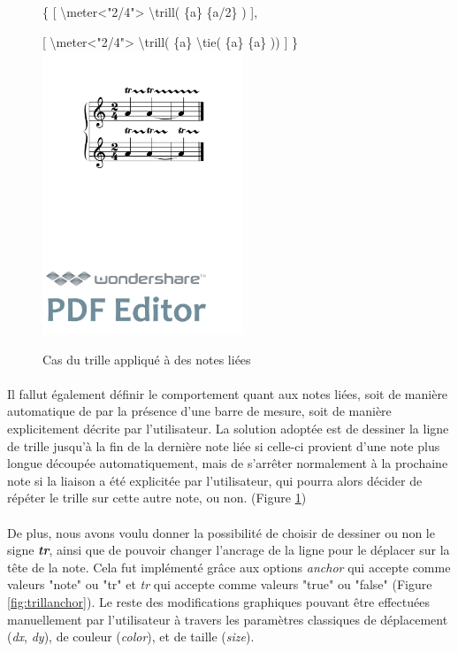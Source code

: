 \documentclass[a4paper,10pt,twocolumn]{article}
\newenvironment{code}
  {\fontfamily{pnc}\selectfont}{}
\begin{document}
\begin{figure}[h]
\centering
\begin{code}
\{
[ \textbackslash{}meter\textless{}"2/4"\textgreater{} \textbackslash{}trill( \{a\} \{a/2\} ) ],

[ \textbackslash{}meter\textless{}"2/4"\textgreater{} \textbackslash{}trill( \{a\} \textbackslash{}tie( \{a\} \{a\} )) ]
\}
\end{code}
\includegraphics[width=6cm]{img/trill.pdf}
\caption{Cas du trille appliqué à des notes liées}
\label{fig:trill}
\end{figure}

\paragraph{}
Il fallut également définir le comportement quant aux notes liées, soit de manière automatique de par la présence d'une barre de mesure, soit de manière explicitement décrite par l'utilisateur. La solution adoptée est de dessiner la ligne de trille jusqu'à la fin de la dernière note liée si celle-ci provient d'une note plus longue découpée automatiquement, mais de s'arrêter normalement à la prochaine note si la liaison a été explicitée par l'utilisateur, qui pourra alors décider de répéter le trille sur cette autre note, ou non. (Figure \ref{fig:trill})

\paragraph{}
De plus, nous avons voulu donner la possibilité de choisir de dessiner ou non le signe \textit{\textbf{tr}}, ainsi que de pouvoir changer l'ancrage de la ligne pour le déplacer sur la tête de la note. Cela fut implémenté grâce aux options \textit{anchor} qui accepte comme valeurs "note" ou "tr" et \textit{tr} qui accepte comme valeurs "true" ou "false" (Figure \ref{fig:trillanchor}). Le reste des modifications graphiques pouvant être effectuées manuellement par l'utilisateur à travers les paramètres classiques de déplacement (\textit{dx}, \textit{dy}), de couleur (\textit{color}), et de taille (\textit{size}).
\end{document}
